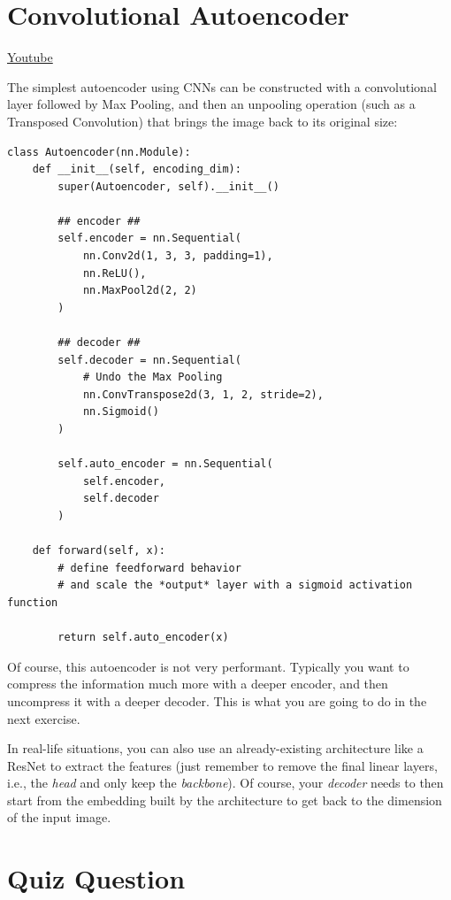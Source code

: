 \section{Convolutional Autoencoder}
\href{https://www.youtube.com/watch?v=bwIWNLEJYUw&ab_channel=Udacity}{Youtube} \newline

The simplest autoencoder using CNNs can be constructed with a convolutional layer followed by Max Pooling, and then an unpooling operation (such as a Transposed Convolution) that brings the image back to its original size:
\begin{lstlisting}
class Autoencoder(nn.Module):
    def __init__(self, encoding_dim):
        super(Autoencoder, self).__init__()

        ## encoder ##
        self.encoder = nn.Sequential(
            nn.Conv2d(1, 3, 3, padding=1),
            nn.ReLU(),
            nn.MaxPool2d(2, 2)
        )

        ## decoder ##
        self.decoder = nn.Sequential(
            # Undo the Max Pooling
            nn.ConvTranspose2d(3, 1, 2, stride=2),
            nn.Sigmoid()
        )

        self.auto_encoder = nn.Sequential(
            self.encoder,
            self.decoder
        )

    def forward(self, x):
        # define feedforward behavior 
        # and scale the *output* layer with a sigmoid activation function

        return self.auto_encoder(x)
\end{lstlisting}
Of course, this autoencoder is not very performant. Typically you want to compress the information much more with a deeper encoder, and then uncompress it with a deeper decoder. This is what you are going to do in the next exercise. \newline

In real-life situations, you can also use an already-existing architecture like a ResNet to extract the features (just remember to remove the final linear layers, i.e., the \textit{head} and only keep the \textit{backbone}). Of course, your \textit{decoder} needs to then start from the embedding built by the architecture to get back to the dimension of the input image.

\section{Quiz Question}

